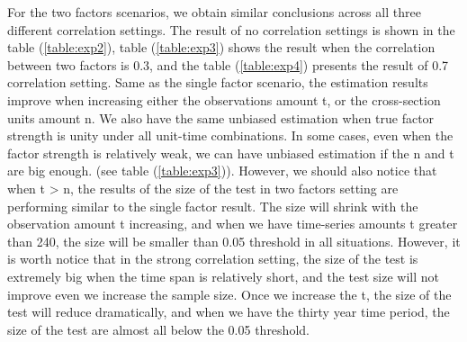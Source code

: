 For the two factors scenarios, we obtain similar conclusions across all three different correlation settings.
The result of no correlation settings is shown in the table (\ref{table:exp2}), table (\ref{table:exp3}) shows the result when the correlation between two factors is 0.3, and the table (\ref{table:exp4}) presents the result of 0.7 correlation setting.
Same as the single factor scenario, the estimation results improve when increasing either the observations amount t, or the cross-section units amount n.
We also have the same unbiased estimation when true factor strength is unity under all unit-time combinations.
In some cases, even when the factor strength is relatively weak, we can have unbiased estimation if the n and t are big enough. (see table (\ref{table:exp3})).
However, we should also notice that when t > n, the results of the size of the test in two factors setting are performing similar to the single factor result. 
The size will shrink with the observation amount t increasing, and when we have time-series amounts t greater than 240, the size will be smaller than 0.05 threshold in all situations.
However, it is worth notice that in the strong correlation setting, the size of the test is extremely big when the time span is relatively short, and the test size will not improve even we increase the sample size.
Once we increase the t, the size of the test will reduce dramatically, and when we have the thirty year time period, the size of the test are almost all below the 0.05 threshold.

